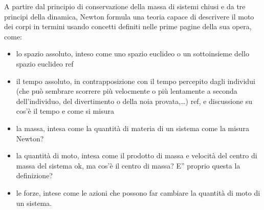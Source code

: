 \documentclass[letterpaper,10pt,italian]{jupyterBook}
\begin{document}
\sphinxAtStartPar
A partire dal principio di conservazione della massa di sistemi chiusi e da tre principi della dinamica, Newton formula una teoria capace di descrivere il moto dei corpi in termini usando concetti definiti nelle prime pagine della sua opera, come:
\begin{itemize}
\item {} 
\sphinxAtStartPar
lo spazio assoluto, inteso come uno spazio euclideo o un sottoinsieme dello spazio euclideo  ref

\item {} 
\sphinxAtStartPar
il tempo assoluto, in contrapposizione con il tempo percepito dagli individui (che può sembrare scorrere più velocmente o più lentamente a seconda dell’individuo, del divertimento o della noia provata,…)  ref, e discussione su cos’è il tempo e come si misura

\item {} 
\sphinxAtStartPar
la massa, intesa come la quantità di materia di un sistema  come la misura Newton?

\item {} 
\sphinxAtStartPar
la quantità di moto, intesa come il prodotto di massa e velocità del centro di massa del sistema  ok, ma cos’è il centro di massa? E” proprio questa la definizione?

\item {} 
\sphinxAtStartPar
le forze, intese come le azioni che possono far cambiare la quantità di moto di un sistema.

\end{itemize}

\sphinxstepscope
\end{document}
